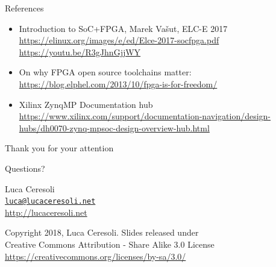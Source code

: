 \documentclass[xetex,table]{beamer}
\begin{document}
\begin{frame}{References}
  \begin{itemize}
  \item Introduction to SoC+FPGA, Marek Vašut, ELC-E 2017\\
    {\footnotesize\url{https://elinux.org/images/e/ed/Elce-2017-socfpga.pdf}}\\
    {\footnotesize\url{https://youtu.be/R3gJhnGjjWY}}
  \item On why FPGA open source toolchains matter:
    {\footnotesize\url{https://blog.elphel.com/2013/10/fpga-is-for-freedom/}}
  \item Xilinx ZynqMP Documentation hub\\
    {\tiny\url{https://www.xilinx.com/support/documentation-navigation/design-hubs/dh0070-zynq-mpsoc-design-overview-hub.html}}
  \end{itemize}
\end{frame}

\begin{frame}
  \begin{center}
    Thank you for your attention

    \vspace{0.15\textheight}

    {\Huge Questions?}

    \vspace{0.15\textheight}

    {\Large Luca Ceresoli}\\
    \href{mailto:luca@lucaceresoli.net}{\tt luca@lucaceresoli.net}\\
    \url{http://lucaceresoli.net}

    \vspace{0.05\textheight}

    \tiny
    \textcopyright{} Copyright 2018, Luca Ceresoli.
    Slides released under\\
    Creative Commons Attribution - Share Alike 3.0 License \\
    \url{https://creativecommons.org/licenses/by-sa/3.0/} \\
  \end{center}
\end{frame}
\end{document}
